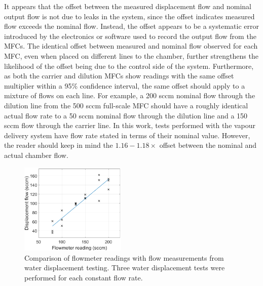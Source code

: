 \documentclass[
  a4paper,
]{scrbook}
\begin{document}
It appears that the offset between the measured displacement flow and
nominal output flow is not due to leaks in the system, since the offset
indicates measured flow exceeds the nominal flow. Instead, the offset
appears to be a systematic error introduced by the electronics or
software used to record the output flow from the MFCs. The identical
offset between measured and nominal flow observed for each MFC, even
when placed on different lines to the chamber, further strengthens the
likelihood of the offset being due to the control side of the system.
Furthermore, as both the carrier and dilution MFCs show readings with
the same offset multiplier within a 95\% confidence interval, the same
offset should apply to a mixture of flows on each line. For example, a
200 sccm nominal flow through the dilution line from the 500 sccm
full-scale MFC should have a roughly identical actual flow rate to a 50
sccm nominal flow through the dilution line and a 150 sccm flow through
the carrier line. In this work, tests performed with the vapour delivery
system have flow rate stated in terms of their nominal value. However,
the reader should keep in mind the \(1.16-1.18 \times\) offset between
the nominal and actual chamber flow.

\begin{figure}

{\centering \includegraphics[width=0.45\textwidth,height=\textheight]{figures/ch5/PID_flowmeter.png}

}

\caption{\label{fig-flowmeter-calibration}Comparison of flowmeter
readings with flow measurements from water displacement testing. Three
water displacement tests were performed for each constant flow rate.}

\end{figure}
\end{document}
